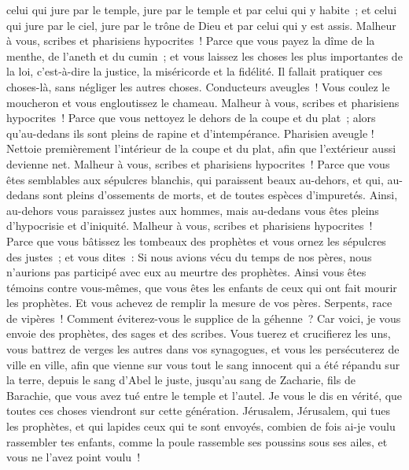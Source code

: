 \begin{multicols}{2}
celui qui jure par le temple, jure par le temple et par celui qui y habite~;
et celui qui jure par le ciel, jure par le trône de Dieu et par celui qui y est assis.
Malheur à vous, scribes et pharisiens hypocrites~! Parce que vous payez la dîme de la menthe, de l'aneth et du cumin~; et vous laissez les choses les plus importantes de la loi, c'est-à-dire la justice, la miséricorde et la fidélité. Il fallait pratiquer ces choses-là, sans négliger les autres choses.
Conducteurs aveugles~! Vous coulez le moucheron et vous engloutissez le chameau.
Malheur à vous, scribes et pharisiens hypocrites~! Parce que vous nettoyez le dehors de la coupe et du plat~; alors qu'au-dedans ils sont pleins de rapine et d'intempérance.
Pharisien aveugle ! Nettoie premièrement l'intérieur de la coupe et du plat, afin que l'extérieur aussi devienne net.
Malheur à vous, scribes et pharisiens hypocrites~! Parce que vous êtes semblables aux sépulcres blanchis, qui paraissent beaux au-dehors, et qui, au-dedans sont pleins d'ossements de morts, et de toutes espèces d'impuretés.
Ainsi, au-dehors vous paraissez justes aux hommes, mais au-dedans vous êtes pleins d'hypocrisie et d'iniquité.
Malheur à vous, scribes et pharisiens hypocrites~! Parce que vous bâtissez les tombeaux des prophètes et vous ornez les sépulcres des justes~;
et vous dites~: Si nous avions vécu du temps de nos pères, nous n'aurions pas participé avec eux au meurtre des prophètes.
Ainsi vous êtes témoins contre vous-mêmes, que vous êtes les enfants de ceux qui ont fait mourir les prophètes.
Et vous achevez de remplir la mesure de vos pères.
Serpents, race de vipères~! Comment éviterez-vous le supplice de la géhenne~?
Car voici, je vous envoie des prophètes, des sages et des scribes. Vous tuerez et crucifierez les uns, vous battrez de verges les autres dans vos synagogues, et vous les persécuterez de ville en ville,
afin que vienne sur vous tout le sang innocent qui a été répandu sur la terre, depuis le sang d'Abel le juste, jusqu'au sang de Zacharie, fils de Barachie, que vous avez tué entre le temple et l'autel.
Je vous le dis en vérité, que toutes ces choses viendront sur cette génération.
Jérusalem, Jérusalem, qui tues les prophètes, et qui lapides ceux qui te sont envoyés, combien de fois ai-je voulu rassembler tes enfants, comme la poule rassemble ses poussins sous ses ailes, et vous ne l'avez point voulu~!

\end{multicols}
